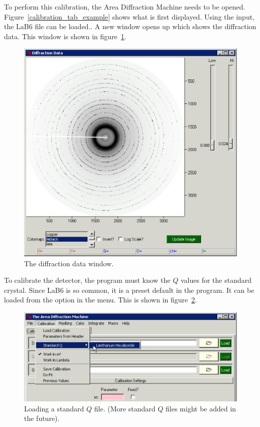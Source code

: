 To perform this calibration, the Area Diffraction Machine needs 
to be opened. Figure~\ref{calibration_tab_example} shows what 
is first displayed. Using the  input, the LaB6
file can be loaded.. A new window opens up which shows the 
diffraction data. This window is shown in 
figure~\ref{diffraction_data_window_example}.

\begin{figure}
    \centering
    \includegraphics[scale=.75]
    {figures/diffraction_data_window_example.eps}
    \caption{The diffraction data window.}
    \label{diffraction_data_window_example}
\end{figure}

To calibrate the detector, the program must know the 
$Q$ values for the standard crystal. Since LaB6 is so common, it is
a preset default in the program. It can be loaded from
the  option in the  menu.
This is shown in figure~\ref{standard_q_example}.

\begin{figure}
    \centering
    \includegraphics[scale=.75]
    {figures/standard_q.eps}
    \caption{Loading a standard $Q$ file.
    (More standard $Q$ files might be added in the future).}
    \label{standard_q_example}
\end{figure}

